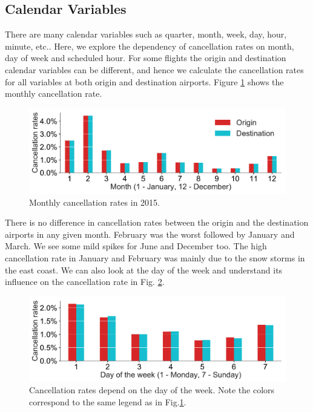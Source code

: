 \documentclass[12pt]{article}
\begin{document}
\subsection{Calendar Variables}
\label{subsec:calvar}
There are many calendar variables such as quarter, month, week, day, hour, minute, etc.. Here, we explore the dependency of cancellation rates on month, day of week and scheduled hour. For some flights the origin and destination calendar variables can be different, and hence we calculate the cancellation rates for all variables at both origin and destination airports. Figure \ref{fig:monthlycanrate} shows the monthly cancellation rate.  
\begin{figure}[h!]
\begin{center}
\includegraphics[width=6in]{monthly_canrate.pdf}
\end{center}
\caption{\label{fig:monthlycanrate}
Monthly cancellation rates in 2015.}
\end{figure}
There is no difference in cancellation rates between the origin and the destination airports in any given month. February was the worst followed by January and March. We see some mild spikes for June and December too. The high cancellation rate in January and February was mainly due to the snow storms in the east coast. We can also look at the day of the week and understand its influence on the cancellation rate in Fig. \ref{fig:weeklycanrate}. 
\begin{figure}[h!]
\begin{center}
\includegraphics[width=6in]{weekly_canrate.pdf}
\end{center}
\caption{\label{fig:weeklycanrate}
Cancellation rates depend on the day of the week. Note the colors correspond to the same legend as in Fig.\ref{fig:monthlycanrate}.}
\end{figure}
\end{document}
